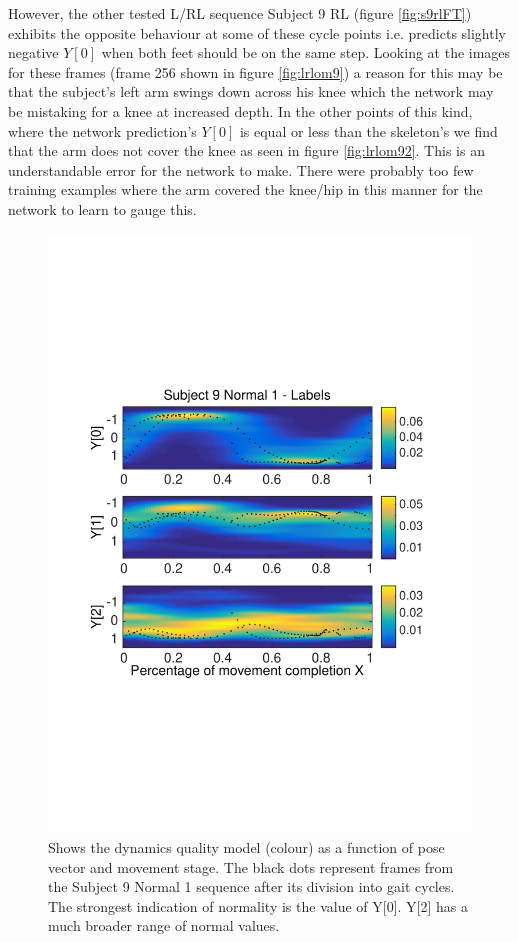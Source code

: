 \documentclass[11pt]{article} %
\begin{document}
However, the other tested L/RL sequence Subject 9 RL (figure \ref{fig:s9rlFT}) exhibits the opposite behaviour at some of these cycle points i.e. predicts slightly negative $Y[0]$ when both feet should be on the same step. Looking at the images for these frames (frame 256 shown in figure \ref{fig:lrlom9}) a reason for this may be that the subject's left arm swings down across his knee which the network may be mistaking for a knee at increased depth. In the other points of this kind, where the network prediction's $Y[0]$ is equal or less than the skeleton's we find that the arm does not cover the knee as seen in figure \ref{fig:lrlom92}. This is an understandable error for the network to make. There were probably too few training examples where the arm covered the knee/hip in this manner for the network to learn to gauge this. 

\begin{figure}
\centering
\includegraphics*[width=0.73\linewidth,trim={0cm 7.5cm 0cm 6.7cm},clip]{quality_s9n1_FT_labels.pdf}
\caption{Shows the dynamics quality model (colour) as a function of pose vector and movement stage. The black dots represent frames from the Subject 9 Normal 1 sequence after its division into gait cycles. The strongest indication of normality is the value of Y[0]. Y[2] has a much broader range of normal values.}
\label{fig:qualityHeatMap}
\end{figure}
\end{document}
